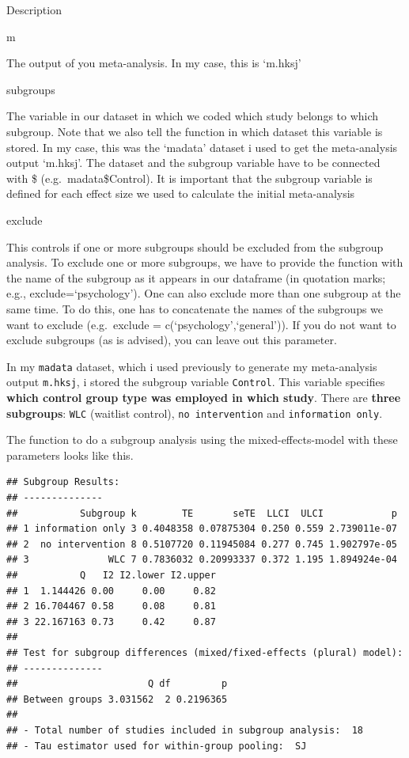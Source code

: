 \documentclass[]{book}
\newenvironment{Shaded}{\begin{snugshade}}{\end{snugshade}}
\newcommand{\DataTypeTok}[1]{\textcolor[rgb]{0.13,0.29,0.53}{#1}}
\newcommand{\KeywordTok}[1]{\textcolor[rgb]{0.13,0.29,0.53}{\textbf{#1}}}
\newcommand{\NormalTok}[1]{#1}
\newcommand{\OperatorTok}[1]{\textcolor[rgb]{0.81,0.36,0.00}{\textbf{#1}}}
\begin{document}
Description

m

The output of you meta-analysis. In my case, this is `m.hksj'

subgroups

The variable in our dataset in which we coded which study belongs to which subgroup. Note that we also tell the function in which dataset this variable is stored. In my case, this was the `madata' dataset i used to get the meta-analysis output `m.hksj'. The dataset and the subgroup variable have to be connected with \$ (e.g.~madata\$Control). It is important that the subgroup variable is defined for each effect size we used to calculate the initial meta-analysis

exclude

This controls if one or more subgroups should be excluded from the subgroup analysis. To exclude one or more subgroups, we have to provide the function with the name of the subgroup as it appears in our dataframe (in quotation marks; e.g., exclude=`psychology'). One can also exclude more than one subgroup at the same time. To do this, one has to concatenate the names of the subgroups we want to exclude (e.g.~exclude = c(`psychology',`general')). If you do not want to exclude subgroups (as is advised), you can leave out this parameter.

In my \texttt{madata} dataset, which i used previously to generate my meta-analysis output \texttt{m.hksj}, i stored the subgroup variable \texttt{Control}. This variable specifies \textbf{which control group type was employed in which study}. There are \textbf{three subgroups}: \texttt{WLC} (waitlist control), \texttt{no\ intervention} and \texttt{information\ only}.

The function to do a subgroup analysis using the mixed-effects-model with these parameters looks like this.

\begin{Shaded}
\end{Shaded}

\begin{verbatim}
## Subgroup Results:
## --------------
##           Subgroup k        TE       seTE  LLCI  ULCI            p
## 1 information only 3 0.4048358 0.07875304 0.250 0.559 2.739011e-07
## 2  no intervention 8 0.5107720 0.11945084 0.277 0.745 1.902797e-05
## 3              WLC 7 0.7836032 0.20993337 0.372 1.195 1.894924e-04
##           Q   I2 I2.lower I2.upper
## 1  1.144426 0.00     0.00     0.82
## 2 16.704467 0.58     0.08     0.81
## 3 22.167163 0.73     0.42     0.87
## 
## Test for subgroup differences (mixed/fixed-effects (plural) model):
## --------------
##                       Q df         p
## Between groups 3.031562  2 0.2196365
## 
## - Total number of studies included in subgroup analysis:  18
## - Tau estimator used for within-group pooling:  SJ
\end{verbatim}
\end{document}
